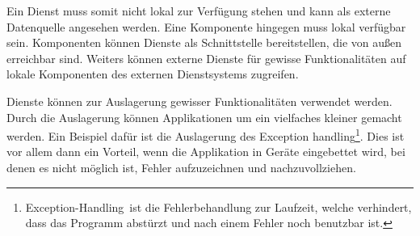 Ein Dienst muss somit nicht lokal zur Verfügung stehen und kann als externe Datenquelle angesehen werden. Eine Komponente hingegen muss lokal verfügbar sein. Komponenten können Dienste als Schnittstelle bereitstellen, die von außen erreichbar sind. Weiters können externe Dienste für gewisse Funktionalitäten auf lokale Komponenten des externen Dienstsystems zugreifen.

Dienste können zur Auslagerung gewisser Funktionalitäten verwendet werden. Durch die Auslagerung können Applikationen um ein vielfaches kleiner gemacht werden. Ein Beispiel dafür ist die Auslagerung des \glqq Exception handling\footnote{\glqq Exception-Handling\grqq\ ist die Fehlerbehandlung zur Laufzeit, welche verhindert, dass das Programm abstürzt und nach einem Fehler noch benutzbar ist.}\grqq . Dies ist vor allem dann ein Vorteil, wenn die Applikation in Geräte eingebettet wird, bei denen es nicht möglich ist, Fehler aufzuzeichnen und nachzuvollziehen.